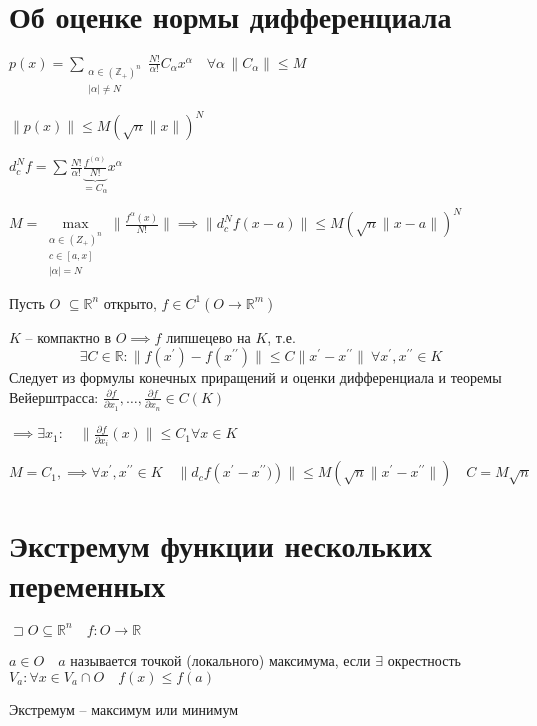 \documentclass{book}
\newcommand\R{\ensuremath{\mathbb{R}}}
\newcommand\Z{\ensuremath{\mathbb{Z}}}
\newcommand{\p}[1]{#1^{\prime}}
\newcommand{\pp}[1]{#1^{\prime\prime}}
\theoremstyle{definition}
\begin{document}
    \section{Об оценке нормы дифференциала}

    $p(x) = \sum_{\substack{\alpha\in \left( \Z _+ \right) ^n \\ |\alpha|\neq  N}} \frac{N!}{\alpha!}C_{\alpha} x^{\alpha}\quad \forall \alpha \,\|C_{\alpha}\|\leqslant M$

    $\|p(x)\|\leqslant M\left( \sqrt{n} \|x\| \right) ^N$

    $d_c^Nf = \sum \frac{N!}{\alpha!}\underbrace{\frac{f^{(\alpha)}}{N!}}_{=C_{\alpha}} x^{\alpha}$ 

    $M = \max\limits_{\substack{\alpha\in \left( Z_+ \right) ^n\\c\in[a,x]\\|\alpha|=N}}\|\frac{f^{\alpha}(x)}{N!}\| \implies  \|d_c^Nf(x-a)\|\leqslant  M\left( \sqrt{n} \|x-a\| \right) ^N$


         Пусть $O$ $\subseteq \R^n$ открыто, $ f\in C^1\left( O \to  \R^m \right) $

        $K$ -- компактно в  $O \implies  f$ липшецево на $K$, т.е.  
        \[\exists C\in \R: \|f\left( \p x \right)  - f\left(\pp x  \right)  \|\leqslant C\|\p x - \pp x\|\ \forall \p x , \pp x \in K\]
        Следует из формулы конечных приращений и оценки дифференциала и теоремы Вейерштрасса: $\frac{\partial f}{\partial x_1}, \ldots, \frac{\partial f}{\partial x_{n} }\in C(K)$

        $\implies \exists x_1: \quad \|\frac{\partial f}{\partial x_i}(x)\|\leqslant C_1 \forall x\in K$
        
        $M = C_1,  \implies \forall \p x, \pp x\in K\quad \|d_c f\left( \p x - \pp x) \right) \|\leqslant  M\left( \sqrt{n}\|\p x - \pp x\|  \right) \quad C = M\sqrt{n}  $ 

        \section{Экстремум функции нескольких переменных}

        \begin{definition}
            $\sqsupset O\subseteq \R^n\quad f:O\to \R$

            $a\in O\quad a$ называется точкой (локального) максимума, если  $\exists $ окрестность $V_a: \forall x\in V_a \cap O\quad f(x) \leqslant f(a)$

            Экстремум -- максимум или минимум
        \end{definition}
\end{document}
